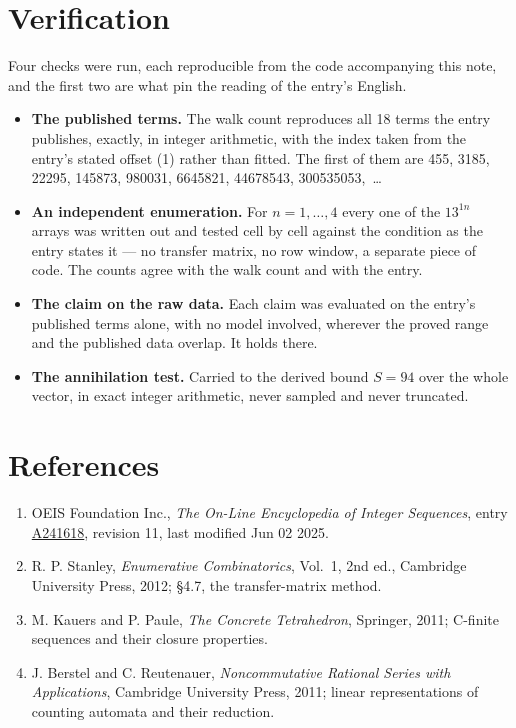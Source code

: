 \documentclass[11pt]{article}
\theoremstyle{definition}
\begin{document}
\section{Verification}

Four checks were run, each reproducible from the code accompanying this note, and the first two are what pin the reading of the entry's English.

\begin{itemize}

\item {\bfseries The published terms.} The walk count reproduces all 18 terms the entry publishes, exactly, in integer arithmetic, with the index taken from the entry's stated offset (1) rather than fitted. The first of them are 455, 3185, 22295, 145873, 980031, 6645821, 44678543, 300535053,~\dots

\item {\bfseries An independent enumeration.} For $n = 1,\dots,4$ every one of the $13^{1n}$ arrays was written out and tested cell by cell against the condition as the entry states it --- no transfer matrix, no row window, a separate piece of code. The counts agree with the walk count and with the entry.

\item {\bfseries The claim on the raw data.} Each claim was evaluated on the entry's published terms alone, with no model involved, wherever the proved range and the published data overlap. It holds there.

\item {\bfseries The annihilation test.} Carried to the derived bound $S = 94$ over the whole vector, in exact integer arithmetic, never sampled and never truncated.

\end{itemize}

\section{References}

\begin{enumerate}

\item OEIS Foundation Inc., \emph{The On-Line Encyclopedia of Integer Sequences}, entry \href{https://oeis.org/A241618}{A241618}, revision 11, last modified Jun 02 2025.

\item R. P. Stanley, \emph{Enumerative Combinatorics}, Vol.~1, 2nd ed., Cambridge University Press, 2012; \S4.7, the transfer-matrix method.

\item M. Kauers and P. Paule, \emph{The Concrete Tetrahedron}, Springer, 2011; C-finite sequences and their closure properties.

\item J. Berstel and C. Reutenauer, \emph{Noncommutative Rational Series with Applications}, Cambridge University Press, 2011; linear representations of counting automata and their reduction.

\end{enumerate}
\end{document}
